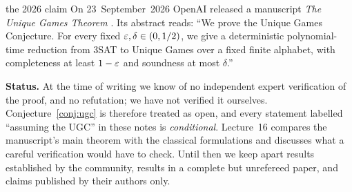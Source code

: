 \begin{statusbox}{the 2026 claim}
On 23~September~2026 OpenAI released a manuscript \emph{The Unique Games Theorem} \citep{OpenAI26}.  Its abstract
reads: ``We prove the Unique Games Conjecture.  For every fixed $\varepsilon,\delta\in(0,1/2)$, we give a
deterministic polynomial-time reduction from $3$SAT to Unique Games over a fixed finite alphabet, with
completeness at least $1-\varepsilon$ and soundness at most $\delta$.''

\smallskip
\textbf{Status.}  At the time of writing we know of no independent expert verification of the proof, and no
refutation; we have not verified it ourselves.  Conjecture~\ref{conj:ugc} is therefore treated as
open, and every statement labelled ``assuming the UGC'' in these notes is \emph{conditional}.  Lecture~16
compares the manuscript's main theorem with the classical formulations and discusses what a careful
verification would have to check.  Until then we keep apart results established by the community,
results in a complete but unrefereed paper, and claims published by their authors only.
\end{statusbox}

